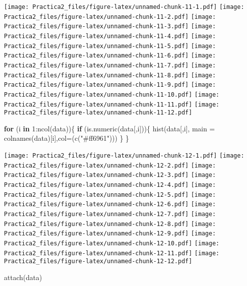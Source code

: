 \documentclass[
]{article}
\newenvironment{Shaded}{\begin{snugshade}}{\end{snugshade}}
\newcommand{\AttributeTok}[1]{\textcolor[rgb]{0.77,0.63,0.00}{#1}}
\newcommand{\ControlFlowTok}[1]{\textcolor[rgb]{0.13,0.29,0.53}{\textbf{#1}}}
\newcommand{\DecValTok}[1]{\textcolor[rgb]{0.00,0.00,0.81}{#1}}
\newcommand{\FunctionTok}[1]{\textcolor[rgb]{0.00,0.00,0.00}{#1}}
\newcommand{\NormalTok}[1]{#1}
\newcommand{\SpecialCharTok}[1]{\textcolor[rgb]{0.00,0.00,0.00}{#1}}
\newcommand{\StringTok}[1]{\textcolor[rgb]{0.31,0.60,0.02}{#1}}
\begin{document}
\texttt{[image: Practica2\_files/figure-latex/unnamed-chunk-11-1.pdf]}
\texttt{[image: Practica2\_files/figure-latex/unnamed-chunk-11-2.pdf]}
\texttt{[image: Practica2\_files/figure-latex/unnamed-chunk-11-3.pdf]}
\texttt{[image: Practica2\_files/figure-latex/unnamed-chunk-11-4.pdf]}
\texttt{[image: Practica2\_files/figure-latex/unnamed-chunk-11-5.pdf]}
\texttt{[image: Practica2\_files/figure-latex/unnamed-chunk-11-6.pdf]}
\texttt{[image: Practica2\_files/figure-latex/unnamed-chunk-11-7.pdf]}
\texttt{[image: Practica2\_files/figure-latex/unnamed-chunk-11-8.pdf]}
\texttt{[image: Practica2\_files/figure-latex/unnamed-chunk-11-9.pdf]}
\texttt{[image: Practica2\_files/figure-latex/unnamed-chunk-11-10.pdf]}
\texttt{[image: Practica2\_files/figure-latex/unnamed-chunk-11-11.pdf]}
\texttt{[image: Practica2\_files/figure-latex/unnamed-chunk-11-12.pdf]}

\begin{Shaded}
\begin{Highlighting}[]
\ControlFlowTok{for}\NormalTok{ (i }\ControlFlowTok{in} \DecValTok{1}\SpecialCharTok{:}\FunctionTok{ncol}\NormalTok{(data))\{}
  \ControlFlowTok{if}\NormalTok{ (}\FunctionTok{is.numeric}\NormalTok{(data[,i]))\{}
  \FunctionTok{hist}\NormalTok{(data[,i], }\AttributeTok{main =} \FunctionTok{colnames}\NormalTok{(data)[i],}\AttributeTok{col=}\NormalTok{(}\FunctionTok{c}\NormalTok{(}\StringTok{"\#ff6961"}\NormalTok{)))}
\NormalTok{  \}}
\NormalTok{\}}
\end{Highlighting}
\end{Shaded}

\texttt{[image: Practica2\_files/figure-latex/unnamed-chunk-12-1.pdf]}
\texttt{[image: Practica2\_files/figure-latex/unnamed-chunk-12-2.pdf]}
\texttt{[image: Practica2\_files/figure-latex/unnamed-chunk-12-3.pdf]}
\texttt{[image: Practica2\_files/figure-latex/unnamed-chunk-12-4.pdf]}
\texttt{[image: Practica2\_files/figure-latex/unnamed-chunk-12-5.pdf]}
\texttt{[image: Practica2\_files/figure-latex/unnamed-chunk-12-6.pdf]}
\texttt{[image: Practica2\_files/figure-latex/unnamed-chunk-12-7.pdf]}
\texttt{[image: Practica2\_files/figure-latex/unnamed-chunk-12-8.pdf]}
\texttt{[image: Practica2\_files/figure-latex/unnamed-chunk-12-9.pdf]}
\texttt{[image: Practica2\_files/figure-latex/unnamed-chunk-12-10.pdf]}
\texttt{[image: Practica2\_files/figure-latex/unnamed-chunk-12-11.pdf]}
\texttt{[image: Practica2\_files/figure-latex/unnamed-chunk-12-12.pdf]}

\begin{Shaded}
\begin{Highlighting}[]
\FunctionTok{attach}\NormalTok{(data)}
\end{Highlighting}
\end{Shaded}
\end{document}
